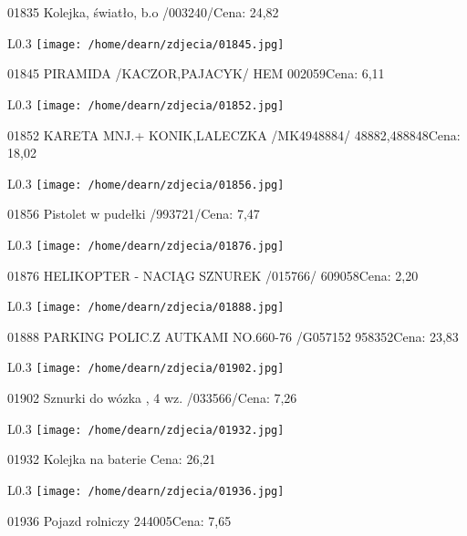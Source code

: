 01835 Kolejka, światło, b.o /003240/Cena: 24,82\newline
\begin{wrapfigure}{L}{0.3\textwidth}
\texttt{[image: /home/dearn/zdjecia/01845.jpg]}
\end{wrapfigure}
01845 PIRAMIDA /KACZOR,PAJACYK/   HEM                 002059Cena: 6,11\newline
\begin{wrapfigure}{L}{0.3\textwidth}
\texttt{[image: /home/dearn/zdjecia/01852.jpg]}
\end{wrapfigure}
01852 KARETA MNJ.+ KONIK,LALECZKA /MK4948884/   48882,488848Cena: 18,02\newline
\begin{wrapfigure}{L}{0.3\textwidth}
\texttt{[image: /home/dearn/zdjecia/01856.jpg]}
\end{wrapfigure}
01856 Pistolet w pudełki /993721/Cena: 7,47\newline
\begin{wrapfigure}{L}{0.3\textwidth}
\texttt{[image: /home/dearn/zdjecia/01876.jpg]}
\end{wrapfigure}
01876 HELIKOPTER - NACIĄG SZNUREK  /015766/           609058Cena: 2,20\newline
\begin{wrapfigure}{L}{0.3\textwidth}
\texttt{[image: /home/dearn/zdjecia/01888.jpg]}
\end{wrapfigure}
01888 PARKING POLIC.Z AUTKAMI NO.660-76 /G057152      958352Cena: 23,83\newline
\begin{wrapfigure}{L}{0.3\textwidth}
\texttt{[image: /home/dearn/zdjecia/01902.jpg]}
\end{wrapfigure}
01902 Sznurki do wózka , 4 wz. /033566/Cena: 7,26\newline
\begin{wrapfigure}{L}{0.3\textwidth}
\texttt{[image: /home/dearn/zdjecia/01932.jpg]}
\end{wrapfigure}
01932 Kolejka na baterie Cena: 26,21\newline
\begin{wrapfigure}{L}{0.3\textwidth}
\texttt{[image: /home/dearn/zdjecia/01936.jpg]}
\end{wrapfigure}
01936 Pojazd rolniczy 244005Cena: 7,65\newline
